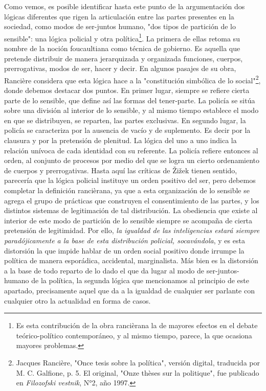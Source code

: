 \documentclass{book}
\begin{document}
Como vemos, es posible identificar hasta este punto de la argumentación
dos lógicas diferentes que rigen la articulación entre las partes
presentes en la sociedad, como modos de ser-juntos humano, "dos tipos de
partición de lo sensible": una lógica policial y otra
política\footnote{Es esta contribución de la obra rancièrana la de
  mayores efectos en el debate teórico-político contemporáneo, y al
  mismo tiempo, parece, la que ocasiona mayores problemas.}. La primera
de ellas retoma su nombre de la noción foucaultiana como técnica de
gobierno. Es aquella que pretende distribuir de manera jerarquizada y
organizada funciones, cuerpos, prerrogativas, modos de ser, hacer y
decir. En algunos pasajes de su obra, Rancière considera que esta lógica
hace a la "constitución simbólica de lo social"\footnote{Jacques
  Rancière, "Once tesis sobre la política", versión digital, traducida
  por M. C. Galfione, p. 5. El original, "Onze thèses sur la politique",
  fue publicado en \emph{Filozofski vestnik}, N°2, año 1997.}, donde
debemos destacar dos puntos. En primer lugar, siempre se refiere cierta
parte de lo sensible, que define así las formas del tener-parte. La
policía se sitúa sobre una división al interior de lo sensible, y al
mismo tiempo establece el modo en que se distribuyen, se reparten, las
partes exclusivas. En segundo lugar, la policía se caracteriza por la
ausencia de vacío y de suplemento. Es decir por la clausura y por la
pretensión de plenitud. La lógica del uno a uno indica la relación
unívoca de cada identidad con su referente. La policía refiere entonces
al orden, al conjunto de procesos por medio del que se logra un cierto
ordenamiento de cuerpos y prerrogativas. Hasta aquí las críticas de
Žižek tienen sentido, parecería que la lógica policial instituye un
orden positivo del ser, pero debemos completar la definición rancièrana,
ya que a esta organización de lo sensible se agrega el grupo de
prácticas que construyen el consentimiento de las partes, y los
distintos sistemas de legitimación de tal distribución. La obediencia
que existe al interior de este modo de partición de lo sensible siempre
se acompaña de cierta pretensión de legitimidad. Por ello, \emph{la
igualdad de las inteligencias estará siempre paradójicamente a la base
de esta distribución policial, socavándola}, y es esta distorsión la que
impide hablar de un orden social positivo donde irrumpe la política de
manera esporádica, accidental, marginalista. Más bien es la distorsión a
la base de todo reparto de lo dado el que da lugar al modo de
ser-juntos-humano de la política, la segunda lógica que mencionamos al
principio de este apartado, precisamente aquel que da a la igualdad de
cualquier ser parlante con cualquier otro la actualidad en forma de
casos.
\end{document}
